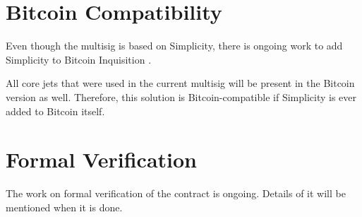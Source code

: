 \documentclass[11pt]{article}
\begin{document}
\section{Bitcoin Compatibility}

Even though the multisig is based on Simplicity, there is ongoing work to add Simplicity to Bitcoin Inquisition \cite{bitcoin-inquisition-binana-simplicity,bitcoin-inquisition-simplicity-impl}.

All core jets that were used in the current multisig will be present in the Bitcoin version as well.
Therefore, this solution is Bitcoin-compatible if Simplicity is ever added to Bitcoin itself.

\section{Formal Verification}

The work on formal verification of the contract is ongoing.
Details of it will be mentioned when it is done.



\end{document}
